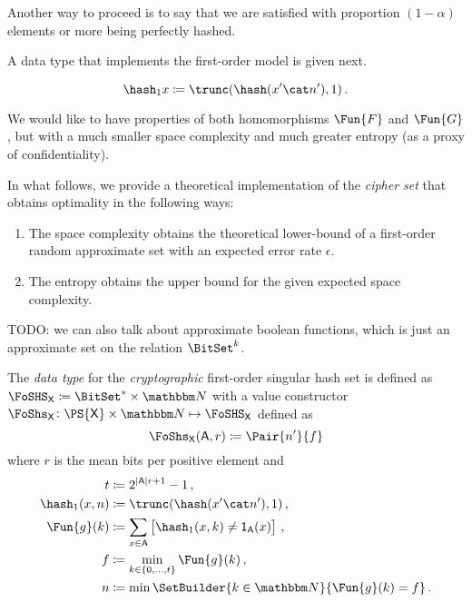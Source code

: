 \documentclass[ ../main.tex]{subfiles}
\begin{document}
Another way to proceed is to say that we are satisfied with proportion $(1-\alpha)$ elements or more being perfectly hashed.













A data type that implements the first-order model is given next.


\begin{equation}
    \hash_1 x \coloneqq \trunc(\hash (x' \cat n'),1)\,.
\end{equation}




We would like to have properties of both homomorphisms $\Fun{F}$ and $\Fun{G}$, but with a much smaller space complexity and much greater entropy (as a proxy of confidentiality).

In what follows, we provide a theoretical implementation of the \emph{cipher set} that obtains optimality in the following ways:
\begin{enumerate}
    \item The space complexity obtains the theoretical lower-bound of a first-order random approximate set with an expected error rate $\epsilon$.
    \item The entropy obtains the upper bound for the given expected space complexity.
\end{enumerate}

TODO: we can also talk about approximate boolean functions, which is just an approximate set on the relation $\BitSet^k$.

\begin{definition}
    \label{alg:makeset}
    The \emph{data type} for the \emph{cryptographic} first-order singular hash set is defined as $\FoSHS_{\Set{X}} \coloneqq \BitSet^* \times \NatSet$ with a value constructor $\FoShs_{\Set{X}} \colon \PS{\Set{X}} \times \NatSet \mapsto \FoSHS_{\Set{X}}$ defined as
    \begin{equation}
        \FoShs_{\Set{X}}(\Set{A},r) \coloneqq \Pair{n'}{f}
    \end{equation}
    where $r$ is the mean bits per positive element and
    \begin{equation}
        \begin{split}
            t			& \coloneqq 2^{\Card{\Set{A}} r+1}-1\,,\\
            \hash_1(x,n)& \coloneqq \trunc(\hash(x' \cat n'),1)\,,\\	
            \Fun{g}(k) 	& \coloneqq \sum_{{x \in \Set{A}}}\left[\hash_1(x,k) \neq \SetIndicator{\Set{A}}(x)\right]\,,\\
            f 			& \coloneqq \min_{k \in \{0,\ldots,t\}} \Fun{g}(k)\,,\\
            n			& \coloneqq \min \SetBuilder{k \in \NatSet}{\Fun{g}(k) = f}\,.\\	
        \end{split}
    \end{equation}
\end{definition}
\end{document}
